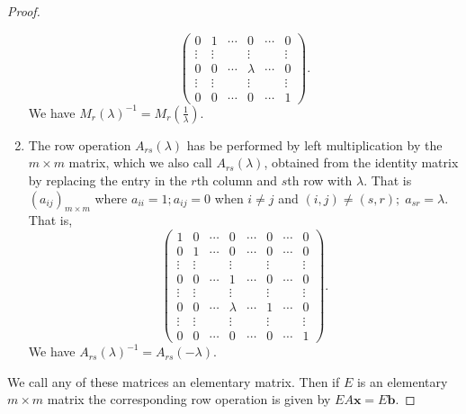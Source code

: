 \documentclass[10pt, a4paper]{article}
\newcommand{\mbf}[1]{\mathbf{#1}}
\begin{document}
\begin{theorem}[continues = thm:lintoech]
\begin{proof}
\begin{enumerate}[label = (\alph*)]
\[\begin{pmatrix}
                0 & 1 & \dotsi & 0 & \dotsi & 0 \\
                \vdots & \vdots & \phantom{} & \vdots & \phantom{} & \vdots \\
                0 & 0 & \dotsi & \lambda & \dotsi & 0 \\
                \vdots & \vdots & \phantom{} & \vdots & \phantom{} & \vdots \\
                0 & 0 & \dotsi & 0 & \dotsi & 1
            \end{pmatrix}.
            \]
            We have $M_r(\lambda) ^ {-1} = M_r\left(\frac{1}{\lambda}\right)$.
            \item The row operation $A_{rs}(\lambda)$ has be performed by left multiplication by the $m \times m$ matrix,
            which we also call $A_{rs}(\lambda)$,
            obtained from the identity matrix by replacing the entry in the $r$th column and $s$th row with $\lambda$.
            That is $(a_{ij})_{m \times m}$ where $a_{ii} = 1; a_{ij} = 0$ when $i \neq j$ and $(i, j) \neq (s, r);\; a_{sr} = \lambda$.
            That is,
            \[
            \begin{pmatrix}
                1 & 0 & \dotsi & 0 & \dotsi & 0 & \dotsi & 0 \\
                0 & 1 & \dotsi & 0 & \dotsi & 0 & \dotsi & 0 \\
                \vdots & \vdots & \phantom{} & \vdots & \phantom{} & \vdots & \phantom{} & \vdots \\
                0 & 0 & \dotsi & 1 & \dotsi & 0 & \dotsi & 0 \\
                \vdots & \vdots & \phantom{} & \vdots & \phantom{} & \vdots & \phantom{} & \vdots \\
                0 & 0 & \dotsi & \lambda & \dotsi & 1 & \dotsi & 0 \\
                \vdots & \vdots & \phantom{} & \vdots & \phantom{} & \vdots & \phantom{} & \vdots \\
                0 & 0 & \dotsi & 0 & \dotsi & 0 & \dotsi & 1
            \end{pmatrix}.
            \]
            We have $A_{rs}(\lambda) ^ {-1} = A_{rs}(-\lambda)$.
        \end{enumerate}
        We call any of these matrices an elementary matrix.
        Then if $E$ is an elementary $m \times m$ matrix the corresponding row operation is given by $EA\mbf{x} = E\mbf{b}$.
    \end{proof}
\end{theorem}
\end{document}
